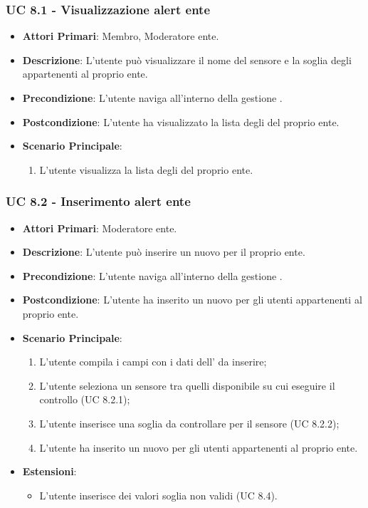 			\subsubsection{UC 8.1 - Visualizzazione alert ente}
			\begin{itemize}
				\item \textbf{Attori Primari}: Membro, Moderatore ente.
				\item \textbf{Descrizione}: L'utente può visualizzare il nome del sensore e la soglia degli  appartenenti al proprio ente.
				\item \textbf{Precondizione}: L'utente naviga all'interno della gestione .
				\item \textbf{Postcondizione}: L'utente ha visualizzato la lista degli  del proprio ente.
				\item \textbf{Scenario Principale}:
				\begin{enumerate}
					\item{L'utente visualizza la lista degli  del proprio ente.}
				\end{enumerate}	
			\end{itemize}
			
			\subsubsection{UC 8.2 - Inserimento alert ente}
			\begin{itemize}
				\item \textbf{Attori Primari}: Moderatore ente.
				\item \textbf{Descrizione}: L'utente può inserire un nuovo  per il proprio ente.
				\item \textbf{Precondizione}: L'utente naviga all'interno della gestione .
				\item \textbf{Postcondizione}: L'utente ha inserito un nuovo  per gli utenti appartenenti al proprio ente.
				\item \textbf{Scenario Principale}:
				\begin{enumerate}
					\item{L'utente compila i campi con i dati dell' da inserire;}
					\item L'utente seleziona un sensore tra quelli disponibile su cui eseguire il controllo (UC 8.2.1);
					\item L'utente inserisce una soglia da controllare per il sensore (UC 8.2.2);
					\item{L'utente ha inserito un nuovo  per gli utenti appartenenti al proprio ente.}
				\end{enumerate}
				\item \textbf{Estensioni}:
				\begin{itemize}
					\item L'utente inserisce dei valori soglia non validi (UC 8.4).
				\end{itemize}		
			\end{itemize}
			
